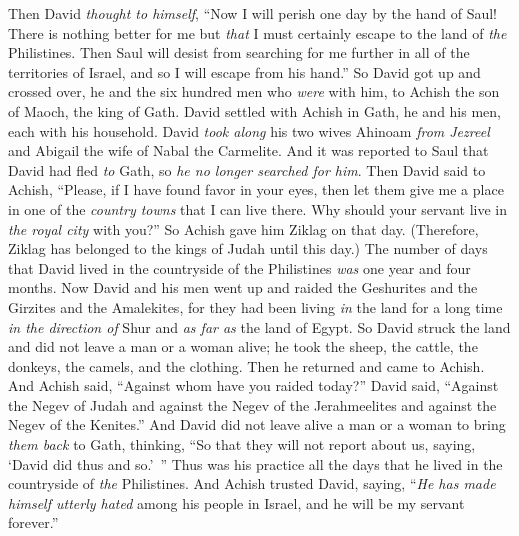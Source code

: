 \begin{biblechapter} %
 Then David \textit{thought to himself}, “Now I will perish one day by the hand of Saul! There is nothing better for me but \textit{that} I must certainly escape to the land of \textit{the} Philistines. Then Saul will desist from searching for me further in all of the territories of Israel, and so I will escape from his hand.”
\verse So David got up and crossed over, he and the six hundred men who \textit{were} with him, to Achish the son of Maoch, the king of Gath.
\verse David settled with Achish in Gath, he and his men, each with his household. David \textit{took along} his two wives Ahinoam \textit{from Jezreel} and Abigail the wife of Nabal the Carmelite.
\verse And it was reported to Saul that David had fled \textit{to} Gath, so \textit{he no longer searched for him}.
\verse Then David said to Achish, “Please, if I have found favor in your eyes, then let them give me a place in one of the \textit{country towns} that I can live there. Why should your servant live in \textit{the royal city} with you?”
\verse So Achish gave him Ziklag on that day. (Therefore, Ziklag has belonged to the kings of Judah until this day.)
\verse The number of days that David lived in the countryside of the Philistines \textit{was} one year and four months.
\verse Now David and his men went up and raided the Geshurites and the Girzites and the Amalekites, for they had been living \textit{in} the land for a long time \textit{in the direction of} Shur and \textit{as far as} the land of Egypt.
\verse So David struck the land and did not leave a man or a woman alive; he took the sheep, the cattle, the donkeys, the camels, and the clothing. Then he returned and came to Achish.
\verse And Achish said, “Against whom have you raided today?” David said, “Against the Negev of Judah and against the Negev of the Jerahmeelites and against the Negev of the Kenites.”
\verse And David did not leave alive a man or a woman to bring \textit{them back} to Gath, thinking, “So that they will not report about us, saying, ‘David did thus and so.’ ” Thus was his practice all the days that he lived in the countryside of \textit{the} Philistines.
\verse And Achish trusted David, saying, “\textit{He has made himself utterly hated} among his people in Israel, and he will be my servant forever.”
\end{biblechapter}

